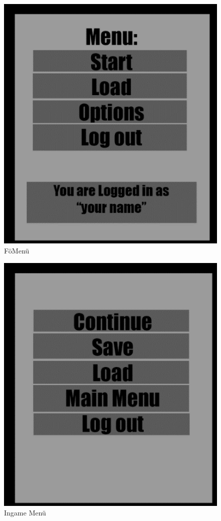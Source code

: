 \begin{figure}[!ht]
	\centering
	\includegraphics[width=\textwidth]{images/image2.png}
	\caption{FöMenü}
	\label{fig:fomenu}
\end{figure}

\begin{figure}[!ht]
	\centering
	\includegraphics[width=\textwidth]{images/image3.png}
	\caption{Ingame Menü}
	\label{fig:ingamemenu}
\end{figure}


